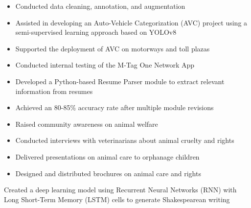 \documentclass[10pt,a4paper,ragged2e,withhyper]{altacv}
\begin{document}


\makecvheader


\begin{paracol}{2}


\begin{itemize}
\item Conducted data cleaning, annotation, and augmentation
\item Assisted in developing an Auto-Vehicle Categorization (AVC) project using a semi-supervised learning approach based on YOLOv8
\item Supported the deployment of AVC on motorways and toll plazas
\item Conducted internal testing of the M-Tag One Network App
\end{itemize}

\divider

\begin{itemize}
\item Developed a Python-based Resume Parser module to extract relevant information from resumes
\item Achieved an 80-85\% accuracy rate after multiple module revisions
\end{itemize}

\divider

\begin{itemize}
\item Raised community awareness on animal welfare
\item Conducted interviews with veterinarians about animal cruelty and rights
\item Delivered presentations on animal care to orphanage children
\item Designed and distributed brochures on animal care and rights
\end{itemize}


Created a deep learning model using Recurrent Neural Networks (RNN) with Long Short-Term Memory (LSTM) cells to generate Shakespearean writing


\end{paracol}
\end{document}

